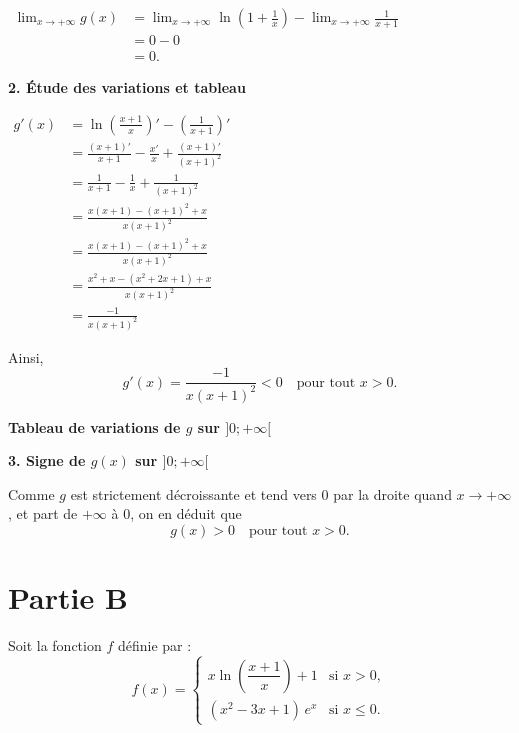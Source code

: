 \documentclass[12pt,a4paper]{article}
\begin{document}
\(
\begin{aligned}
\lim_{x \to +\infty} g(x) 
&= \lim_{x \to +\infty} \ln\left( 1 + \frac{1}{x} \right) - \lim_{x \to +\infty} \frac{1}{x+1} \\
&= 0 - 0 \\
&= 0.
\end{aligned}
\)

\bigskip

\textbf{2. Étude des variations et tableau}

\(
\begin{aligned}
    g'(x) &= \ln\left( \frac{x+1}{x} \right)' - \left(\frac{1}{x+1}\right)'\\
          &= \frac{(x+1)'}{x+1} - \frac{x'}{x} + \frac{(x+1)'}{(x+1)^2}\\
          &= \frac{1}{x+1} - \frac{1}{x} + \frac{1}{(x+1)^2}\\
          &= \frac{x(x+1) - (x+1)^2 + x}{x(x+1)^2}\\
          &= \frac{x(x+1) - (x+1)^2 + x}{x(x+1)^2}\\
          &= \frac{x^2 + x - (x^2 + 2x + 1) + x}{x(x+1)^2}\\
          &= \frac{-1}{x(x+1)^2}
\end{aligned}
\)

Ainsi,
\[
g'(x) = \frac{-1}{x(x+1)^2} < 0 \quad \text{pour tout } x > 0.
\]

\bigskip

\textbf{Tableau de variations de \( g \) sur \( ]0; +\infty[ \)}


\bigskip

\textbf{3. Signe de \( g(x) \) sur \( ]0; +\infty[ \)}

Comme \( g \) est strictement décroissante et tend vers 0 par la droite quand \( x \to +\infty \), et part de \( +\infty \) à 0, on en déduit que
\[
g(x) > 0 \quad \text{pour tout } x > 0.
\]

\section*{Partie B}

Soit la fonction \( f \) définie par :
\[
f(x) = 
\begin{cases}
x \ln\left( \dfrac{x+1}{x} \right) + 1 & \text{si } x > 0, \\[6pt]
(x^2 - 3x + 1)\, e^x & \text{si } x \leq 0.
\end{cases}
\]
\end{document}
